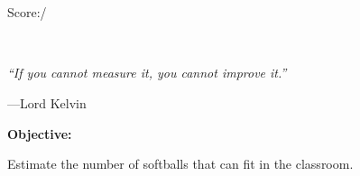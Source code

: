 



\vspace*{-0.2in} %
\noindent
{} 
\makebox[0.25\textwidth][l]{\hrulefill}\\[0.25cm]
\hfill 
{}\hfill
\makebox[0.25\textwidth][l]{ \texttt{\underline\coursename}}\hfill \\[0.25cm]
\makebox[0.65\textwidth]{}\hfill
\makebox[0.25\textwidth][l]{\enspace\texttt{\underline{\term\ \courseyear}}}\hfill 
\hfill{Score:\underline{\hspace{2cm}}/\numpoints}
\vspace{0.5in} %

\begin{centering}
\noindent\textbf{\Large \worksheetname} \\[0.1in]
\end{centering}
\vspace{0.1in}
\epigraph{\itshape``If you cannot measure it, you cannot improve it.''}{---Lord Kelvin}
\qsp
\textbf{\Large Objective:}

\qsp
Estimate the number of softballs that can fit in the classroom.
\qsp

